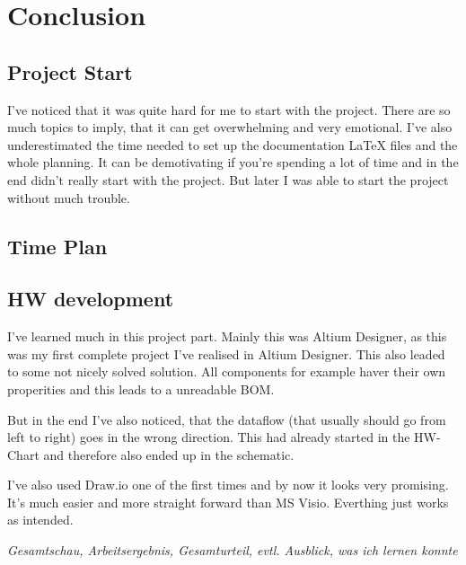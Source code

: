 \chapter{Conclusion}
\label{cha:Conclusion}


\section{Project Start}
I've noticed that it was quite hard for me to start with the project. There are so much topics to imply, that it can get overwhelming and very emotional. I've also underestimated the time needed to set up the documentation LaTeX files and the whole planning. It can be demotivating if you're spending a lot of time and in the end didn't really start with the project. But later I was able to start the project without much trouble. 


\section{Time Plan}


\section{HW development}
I've learned much in this project part. Mainly this was Altium Designer, as this was my first complete project I've realised in Altium Designer. This also leaded to some not nicely solved solution. All components for example haver their own properities and this leads to a unreadable BOM.

But in the end I've also noticed, that the dataflow (that usually should go from left to right) goes in the wrong direction. This had already started in the HW-Chart and therefore also ended up in the schematic.

I've also used Draw.io one of the first times and by now it looks very promising. It's much easier and more straight forward than MS Visio. Everthing just works as intended.



\textit{Gesamtschau, Arbeitsergebnis, Gesamturteil, evtl. Ausblick, was ich lernen konnte}